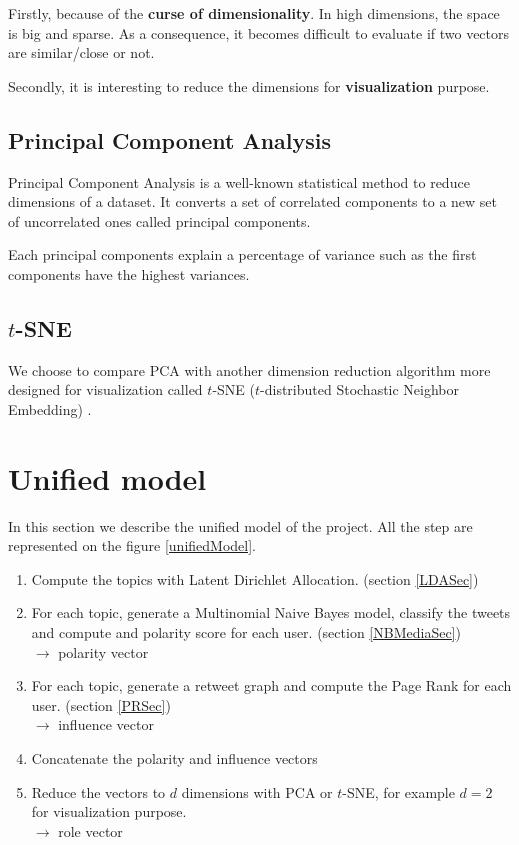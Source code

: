 \documentclass[a4paper,twoside,12pt,openright]{report}
\begin{document}
Firstly, because of the \textbf{curse of dimensionality}. In high dimensions, the space is big and sparse. As a consequence, it becomes difficult to evaluate if two vectors are similar/close or not.

Secondly, it is interesting to reduce the dimensions for \textbf{visualization} purpose.

\subsection{Principal Component Analysis}
Principal Component Analysis is a well-known statistical method to reduce dimensions of a dataset. It converts a set of correlated components to a new set of uncorrelated ones called principal components.

Each principal components explain a percentage of variance such as the first components have the highest variances.
\subsection{$t$-SNE}
We choose to compare PCA with another dimension reduction algorithm more designed for visualization called $t$-SNE ($t$-distributed Stochastic Neighbor Embedding) \cite{van2008visualizing}.



\newpage

\section{Unified model}
In this section we describe the unified model of the project. All the step are represented on the figure \ref{unifiedModel}.

\begin{enumerate}
\item Compute the topics with Latent Dirichlet Allocation. (section \ref{LDASec})
\item For each topic, generate a Multinomial Naive Bayes model, classify the tweets and compute and polarity score for each user. (section \ref{NBMediaSec})\\
$\rightarrow$ polarity vector
\item For each topic, generate a retweet graph and compute the Page Rank for each user. (section \ref{PRSec})\\
$\rightarrow$ influence vector
\item Concatenate the polarity and influence vectors
\item Reduce the vectors to $d$ dimensions with PCA or $t$-SNE, for example $d = 2$ for visualization purpose.\\
$\rightarrow$ role vector
\end{enumerate}
\end{document}
